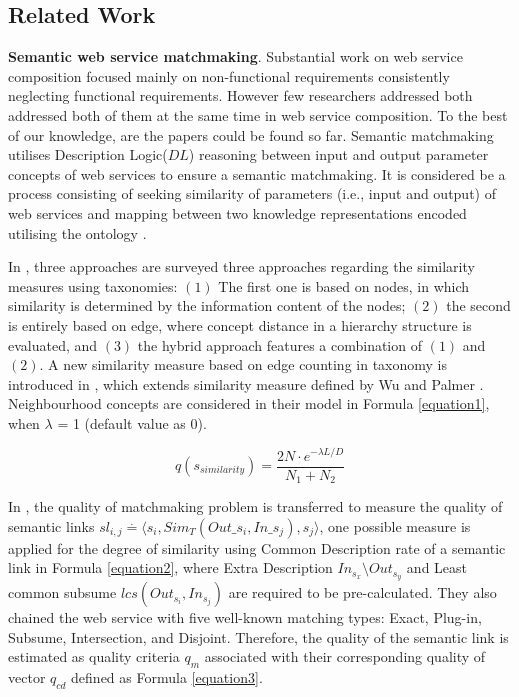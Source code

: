 \documentclass{llncs}
\begin{document}
\subsection{Related Work} \label{relatedWork}
\textbf{Semantic web service matchmaking}. Substantial work \cite{bansal2016generalized,mier2015integrated,da2016particle,da2015graphevol,yu2013adaptive} on web service composition focused mainly on non-functional requirements consistently neglecting functional requirements. However few researchers addressed both addressed both of them at the same time in web service composition. To the best of our knowledge, \cite{fanjiang2014semantic,lecue2009optimizing} are the papers could be found so far. Semantic matchmaking utilises Description Logic($DL$) \cite{baader2003description} reasoning between input and output parameter concepts of web services to ensure a semantic matchmaking. It is considered be a process consisting of seeking similarity of parameters (i.e., input and output) of web services and mapping between two knowledge representations encoded utilising the ontology \cite{lecue2006formal}.

In \cite{shet2012new}, three approaches are surveyed three approaches regarding the similarity measures using taxonomies: $(1)$ The first one is based on nodes, in which similarity is determined by the information content of the nodes; $(2)$ the second is entirely based on edge, where concept distance in a hierarchy structure is evaluated, and $(3)$ the hybrid approach features a combination of $(1)$ and $(2)$. A new similarity measure based on edge counting in taxonomy is introduced in \cite{shet2012new}, which extends similarity measure defined by Wu and Palmer \cite{wu1994verbs}. Neighbourhood concepts are considered in their model in Formula \ref{equation1}, when $\lambda$ = 1 (default value as 0).

\begin{equation}
q(s_ {similarity}){=} \frac{2N \cdot e^{-\lambda L/D} }{N_{1}+N_{2}}
\label{equation1}
\end{equation}

In \cite{lecue2009optimizing}, the quality of matchmaking problem is transferred to measure the quality of semantic links $sl_{i,j} \stackrel{.}{=} \langle s_{i}, Sim_{T}(Out\_s_i,In\_s_j),s_{j}  \rangle$, one possible measure is applied for the degree of similarity using Common Description rate of a semantic link in Formula \ref{equation2}, where Extra Description $In_{s_{x}} \setminus Out_{s_{y}}$ and Least common subsume $lcs(Out_{s_i},In_{s_j})$ are required to be pre-calculated. They also chained the web service with five well-known matching types: Exact, Plug-in, Subsume, Intersection, and Disjoint. Therefore, the quality of the semantic link is estimated as quality criteria $q_{m}$ associated with their corresponding quality of vector $q_{cd}$ defined as Formula \ref{equation3}.
\end{document}
